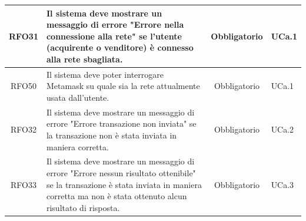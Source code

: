 \documentclass[a4paper, 12pt]{article}
\begin{document}
\begin{longtable}{|c|p{7cm}|c|p{4cm}|}
\hline
RFO31 & Il sistema deve mostrare un messaggio di errore "Errore nella connessione alla rete" se l'utente (acquirente o venditore) è connesso alla rete sbagliata. & Obbligatorio & UCa.1 \\
\hline
RFO50 & Il sistema deve poter interrogare Metamask su quale sia la rete attualmente usata dall'utente. & Obbligatorio & UCa.1 \\
\hline
RFO32 & Il sistema deve mostrare un messaggio di errore "Errore transazione non inviata" se la transazione non è stata inviata in maniera corretta. & Obbligatorio & UCa.2 \\
\hline
RFO33 & Il sistema deve mostrare un messaggio di errore "Errore nessun risultato ottenibile" se la transazione è stata inviata in maniera corretta ma non è stata ottenuto alcun risultato di risposta. & Obbligatorio & UCa.3 \\
\hline

\end{longtable}
\pagebreak
\end{document}
